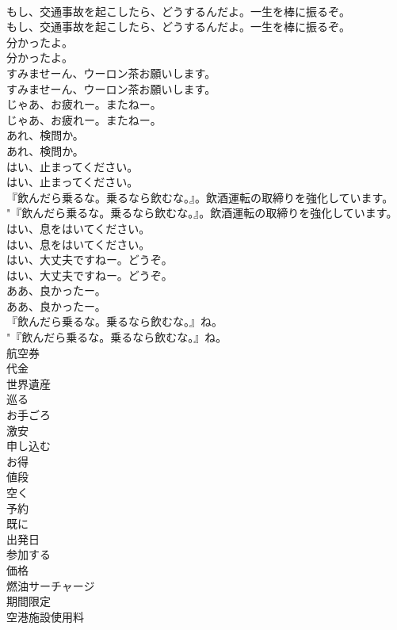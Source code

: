 \documentclass[8pt]{extreport}
\begin{document}
\begin{CJK}{UTF8}{min}
\\	もし、交通事故を起こしたら、どうするんだよ。一生を棒に振るぞ。	
\\	もし、交通事故を起こしたら、どうするんだよ。一生を棒に振るぞ。 
\\	分かったよ。	
\\	分かったよ。 
\\	すみませーん、ウーロン茶お願いします。	
\\	すみませーん、ウーロン茶お願いします。 
\\	じゃあ、お疲れー。またねー。	
\\	じゃあ、お疲れー。またねー。 
\\	あれ、検問か。	
\\	あれ、検問か。 
\\	はい、止まってください。	
\\	はい、止まってください。 
\\	『飲んだら乗るな。乗るなら飲むな。』。飲酒運転の取締りを強化しています。	
\\	"『飲んだら乗るな。乗るなら飲むな。』。飲酒運転の取締りを強化しています。 
\\	はい、息をはいてください。	
\\	はい、息をはいてください。 
\\	はい、大丈夫ですねー。どうぞ。	
\\	はい、大丈夫ですねー。どうぞ。 
\\	ああ、良かったー。	
\\	ああ、良かったー。 
\\	『飲んだら乗るな。乗るなら飲むな。』ね。	
\\	"『飲んだら乗るな。乗るなら飲むな。』ね。 
\\	航空券
\\	代金
\\	世界遺産
\\	巡る
\\	お手ごろ
\\	激安
\\	申し込む
\\	お得
\\	値段
\\	空く
\\	予約
\\	既に
\\	出発日
\\	参加する
\\	価格
\\	燃油サーチャージ
\\	期間限定
\\	空港施設使用料

\end{CJK}
\end{document}
